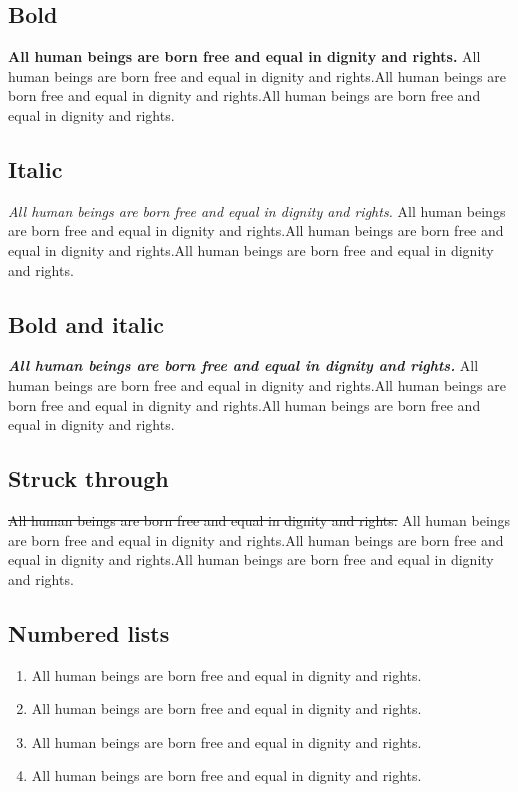 \documentclass[
  ngerman,
  american,
  letterpaper,
  DIV=11,
  numbers=noendperiod]{scrartcl}
\providecommand{\tightlist}{%
  \setlength{\itemsep}{0pt}\setlength{\parskip}{0pt}}
\begin{document}
\subsection{Bold}\label{bold}

\textbf{All human beings are born free and equal in dignity and rights.}
All human beings are born free and equal in dignity and rights.All human
beings are born free and equal in dignity and rights.All human beings
are born free and equal in dignity and rights.

\subsection{Italic}\label{italic}

\emph{All human beings are born free and equal in dignity and rights.}
All human beings are born free and equal in dignity and rights.All human
beings are born free and equal in dignity and rights.All human beings
are born free and equal in dignity and rights.

\subsection{Bold and italic}\label{bold-and-italic}

\textbf{\emph{All human beings are born free and equal in dignity and
rights.}} All human beings are born free and equal in dignity and
rights.All human beings are born free and equal in dignity and
rights.All human beings are born free and equal in dignity and rights.

\subsection{Struck through}\label{struck-through}

\st{All human beings are born free and equal in dignity and rights.} All
human beings are born free and equal in dignity and rights.All human
beings are born free and equal in dignity and rights.All human beings
are born free and equal in dignity and rights.

\subsection{Numbered lists}\label{numbered-lists}

\begin{enumerate}
\def\labelenumi{\arabic{enumi}.}
\tightlist
\item
  All human beings are born free and equal in dignity and rights.
\item
  All human beings are born free and equal in dignity and rights.
\item
  All human beings are born free and equal in dignity and rights.
\item
  All human beings are born free and equal in dignity and rights.
\end{enumerate}
\end{document}
